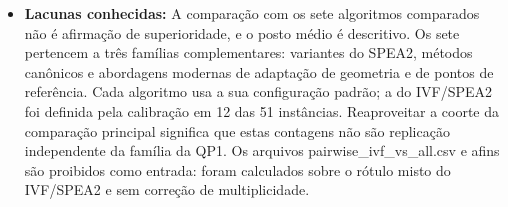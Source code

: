 \begin{itemize}[nosep]
    \item \textbf{Lacunas conhecidas:} A comparação com os sete algoritmos comparados não é afirmação de superioridade, e o posto médio é descritivo. Os sete pertencem a três famílias complementares: variantes do SPEA2, métodos canônicos e abordagens modernas de adaptação de geometria e de pontos de referência. Cada algoritmo usa a sua configuração padrão; a do IVF/SPEA2 foi definida pela calibração em 12 das 51 instâncias. Reaproveitar a coorte da comparação principal significa que estas contagens não são replicação independente da família da QP1. Os arquivos pairwise\_ivf\_vs\_all.csv e afins são proibidos como entrada: foram calculados sobre o rótulo misto do IVF/SPEA2 e sem correção de multiplicidade.
\end{itemize}
